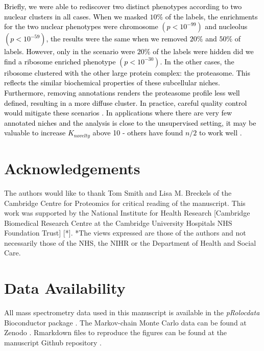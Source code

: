 \documentclass[12pt,english]{article}
\begin{document}
\textcolor{black}{ 
Briefly, we were able to rediscover two distinct phenotypes according to two nuclear clusters in all cases. When we masked $10\%$ of the labels, the enrichments for the two nuclear phenotypes were chromosome $(p < 10^{-99})$ and nucleolus $(p < 10^{-59})$, the results were the same when we removed $20\%$ and $50\%$ of labels. However, only in the scenario were $20\%$ of the labels were hidden did we find a ribosome enriched phenotype $(p < 10^{-30})$. In the other cases, the ribosome clustered with the other large protein complex: the proteasome. This reflects the similar biochemical properties of these subcellular niches. Furthermore, removing annotations renders the proteasome profile less well defined, resulting in a more diffuse cluster. In practice, careful quality control would mitigate these scenarios \citep{Gatto::2019}. In applications where there are very few annotated niches and the analysis is close to the unsupervised setting, it may be valuable to increase $K_{novelty}$ above 10 - others have found $n/2$ to work well \citep{Kirk:2012}.
}

 
 
\section{Acknowledgements}
The authors would like to thank Tom Smith and Lisa M. Breckels of the Cambridge Centre for Proteomics for critical reading of the manuscript. This work was supported by the National Institute for Health Research [Cambridge Biomedical Research Centre at the Cambridge University Hospitals NHS Foundation Trust] [*]. *The views expressed are those of the authors and not necessarily those of the NHS, the NIHR or the Department of Health and Social Care.

\section{Data Availability}
All mass spectrometry data used in this manuscript is available in the \textit{pRolocdata} Bioconductor package \citep{pRoloc:2014}. The Markov-chain Monte Carlo data can be found at Zenodo \citep{Crookdata}. Rmarkdown files to reproduce the figures can be found at the manuscript Github repository \citep{noveltyGithub}.



\clearpage


\end{document}
